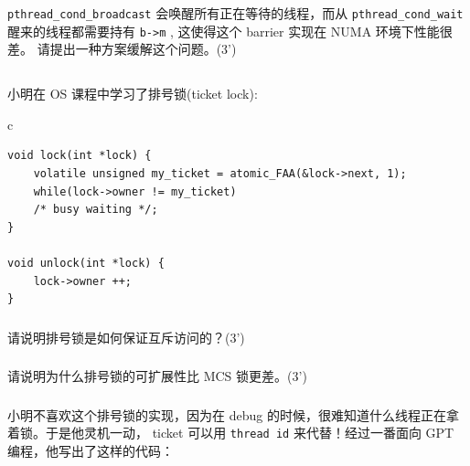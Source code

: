 \documentclass[a4paper,12pt]{article}
\newcommand{\score}[1]{(#1')}
\begin{document}
\verb|pthread_cond_broadcast| 会唤醒所有正在等待的线程，而从 \verb|pthread_cond_wait| 醒来的线程都需要持有 \verb|b->m| , 这使得这个 barrier 实现在 NUMA 环境下性能很差。
请提出一种方案缓解这个问题。\score{3}

\subsection{}

小明在 OS 课程中学习了排号锁(ticket lock):

\begin{table}[htb]
  \centering
  \begin{tabular}{c}
    \begin{lstlisting}
void lock(int *lock) {
    volatile unsigned my_ticket = atomic_FAA(&lock->next, 1);
    while(lock->owner != my_ticket)
	/* busy waiting */;
}

void unlock(int *lock) {
    lock->owner ++;
}
    \end{lstlisting}
  \end{tabular}
\end{table}

\subsubsection{}

请说明排号锁是如何保证互斥访问的？\score{3}

\subsubsection{}

请说明为什么排号锁的可扩展性比 MCS 锁更差。\score{3}

\subsubsection{}

小明不喜欢这个排号锁的实现，因为在 debug 的时候，很难知道什么线程正在拿着锁。于是他灵机一动， ticket 可以用 \verb|thread id| 来代替！经过一番面向 GPT 编程，他写出了这样的代码：
\end{document}
